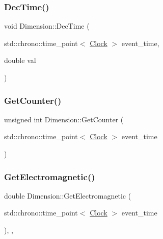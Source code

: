 \mbox{\label{classDimension_a25978bcb1f62aa7ed909463d08d92ca4}} 
\subsubsection{\texorpdfstring{Dec\+Time()}{DecTime()}}
{\footnotesize\ttfamily void Dimension\+::\+Dec\+Time (\begin{DoxyParamCaption}\item[{std\+::chrono\+::time\+\_\+point$<$ \mbox{\hyperlink{universe_8h_a0ef8d951d1ca5ab3cfaf7ab4c7a6fd80}{Clock}} $>$}]{event\+\_\+time,  }\item[{double}]{val }\end{DoxyParamCaption})}

\mbox{\label{classDimension_a2fbee64eeea5de3d8eab10cf0fdb6363}} 
\subsubsection{\texorpdfstring{Get\+Counter()}{GetCounter()}}
{\footnotesize\ttfamily unsigned int Dimension\+::\+Get\+Counter (\begin{DoxyParamCaption}\item[{std\+::chrono\+::time\+\_\+point$<$ \mbox{\hyperlink{universe_8h_a0ef8d951d1ca5ab3cfaf7ab4c7a6fd80}{Clock}} $>$}]{event\+\_\+time }\end{DoxyParamCaption})\hspace{0.3cm}{\ttfamily [inline]}}

\mbox{\label{classDimension_a21783c29a576518b722512f1245fa598}} 
\subsubsection{\texorpdfstring{Get\+Electromagnetic()}{GetElectromagnetic()}}
{\footnotesize\ttfamily double Dimension\+::\+Get\+Electromagnetic (\begin{DoxyParamCaption}\item[{std\+::chrono\+::time\+\_\+point$<$ \mbox{\hyperlink{universe_8h_a0ef8d951d1ca5ab3cfaf7ab4c7a6fd80}{Clock}} $>$}]{event\+\_\+time }\end{DoxyParamCaption})\hspace{0.3cm}{\ttfamily [inline]}, {\ttfamily [final]}, {\ttfamily [virtual]}}



